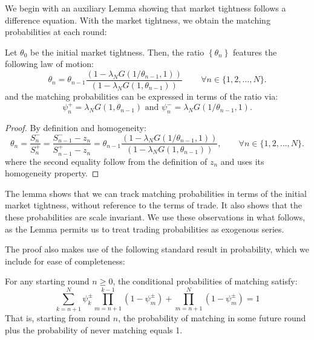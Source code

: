 \renewcommand{\theequation}{A.\arabic{equation}}
\setcounter{equation}{0}
\renewcommand{\thedefinition}{A.\arabic{definition}}
\setcounter{definition}{0}

We begin with an auxiliary Lemma showing that market tightness follows a difference equation. With the market tightness, we obtain the matching probabilities at each round:

\begin{lemma}\label{lem:C_Continuities}
Let $\theta_{0}$ be the initial market tightness. Then,
the ratio $\left\{ \theta_{n}\right\}$ features the following law
of motion: 
\[
\theta_{n}=\theta_{n-1}\frac{\left(1-\lambda_{N}G\left(1/\theta_{n-1},1\right)\right)}{\left(1-\lambda_{N}G\left(1,\theta_{n-1}\right)\right)}\,\qquad\forall n\in\{1,2,\dots,N\}.
\]
and the matching probabilities can be expressed in terms of the ratio
via:
\[
\psi_{n}^{+}=\lambda_{N}G\left(1,\theta_{n-1}\right)\text{ and }\psi_{n}^{-}=\lambda_{N}G\left(1/\theta_{n-1},1\right).
\]
\end{lemma}

\begin{proof}
By definition and homogeneity:
\[
\theta_{n}=\frac{S_{n}^{-}}{S_{n}^{+}}=\frac{S_{n-1}^{-}-z_{n}}{S_{n-1}^{+}-z_{n}}=\theta_{n-1}\frac{\left(1-\lambda_{N}G\left(1/\theta_{n-1},1\right)\right)}{\left(1-\lambda_{N}G\left(1,\theta_{n-1}\right)\right)},\qquad\forall n\in\{1,2,\dots,N\}.
\]
where the second equality follow from the definition of $z_{n}$ and
uses its homogeneity property.
\end{proof}

The lemma shows that we can track matching probabilities
in terms of the initial market tightness, without reference to the terms of trade. It also shows that the these probabilities are scale invariant. We use these observations in what follows, as the Lemma permits us to treat trading probabilities as exogenous series.

The proof also makes use of the following standard result in probability, which we include for ease of completeness:
\begin{lemma}
\label{lem:appendix.condprobs}
For any starting round $n \geq 0$, the conditional probabilities of matching satisfy:
\[
\sum_{k=n+1}^{N} \psi_{k}^{\pm}\prod_{m=n+1}^{k-1}(1-\psi_{m}^{\pm}) + \prod_{m=n+1}^{N}(1-\psi_{m}^{\pm}) = 1
\]
That is, starting from round $n$, the probability of matching in some future round plus the probability of never matching equals 1.
\end{lemma}

